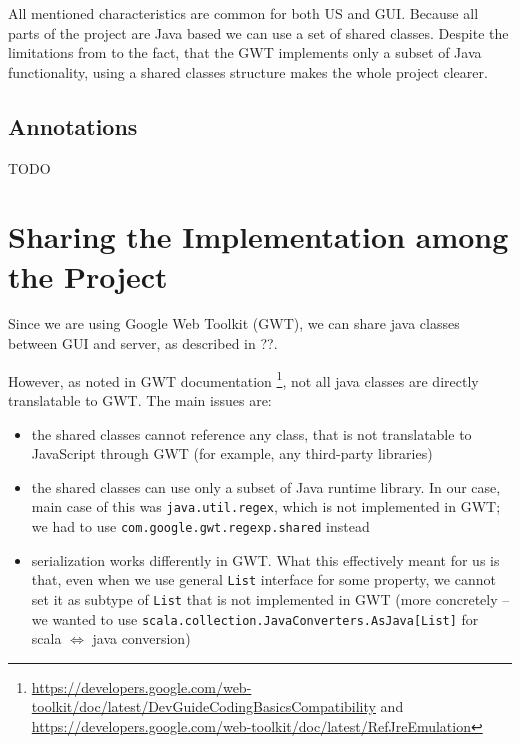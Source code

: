 All mentioned characteristics are common for both US and GUI. Because all parts of the project are Java based we can use a set of shared classes. Despite the limitations from to the fact, that the GWT implements only a subset of Java functionality, using a shared classes structure makes the whole project clearer. 

\subsection*{Annotations}

TODO 


\section{Sharing the Implementation among the Project}

Since we are using Google Web Toolkit (GWT), we can share java classes between GUI and server, as described in ??.

However, as noted in GWT documentation \footnote{\url{https://developers.google.com/web-toolkit/doc/latest/DevGuideCodingBasicsCompatibility} and \url{https://developers.google.com/web-toolkit/doc/latest/RefJreEmulation}}, not all java classes are directly translatable to GWT. The main issues are:

\begin{itemize}
\item the shared classes cannot reference any class, that is not translatable to JavaScript through GWT (for example, any third-party libraries)
\item the shared classes can use only a subset of Java runtime library. In our case, main case of this was \texttt{java.util.regex}, which is not implemented in GWT; we had to use \texttt{com.google.gwt.regexp.shared} instead
\item serialization works differently in GWT. What this effectively meant for us is that, even when we use general \texttt{List} interface for some property, we cannot set it as subtype of \texttt{List} that is not implemented in GWT (more concretely -- we wanted to use \texttt{scala.collection.JavaConverters.AsJava[List]} for scala $\Leftrightarrow$ java conversion)
\end{itemize}

